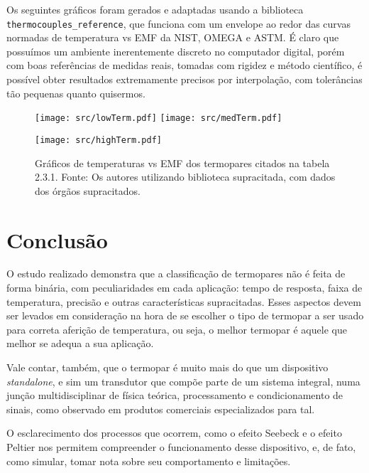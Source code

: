 \documentclass[a4paper,12pt]{report}
\begin{document}
	Os seguintes gráficos foram gerados e adaptadas usando a biblioteca \texttt{thermocouples\_reference}, que funciona com um envelope ao redor das curvas normadas de temperatura vs EMF da NIST, OMEGA e ASTM. É claro que possuímos um ambiente inerentemente discreto no computador digital, porém com boas referências de medidas reais, tomadas com rigidez e método científico, é possível obter resultados extremamente precisos por interpolação, com tolerâncias tão pequenas quanto quisermos.

	\begin{figure}[htbp]
	\texttt{[image: src/lowTerm.pdf]}
	\texttt{[image: src/medTerm.pdf]}
	\begin{center}
		\texttt{[image: src/highTerm.pdf]}
		
		\caption{Gráficos de temperaturas vs EMF dos termopares citados na tabela 2.3.1. Fonte: Os autores utilizando biblioteca supracitada, com dados dos órgãos supracitados.}
	\end{center}
	\end{figure}

\newpage

	\chapter{Conclusão}
	O estudo realizado demonstra que a classificação de termopares não é feita de forma binária, com peculiaridades em cada aplicação: tempo de resposta, faixa de temperatura, precisão e outras características supracitadas. Esses aspectos devem ser levados em consideração na hora de se escolher o tipo de termopar a ser usado para correta aferição de temperatura, ou seja, o melhor termopar é aquele que melhor se adequa a sua aplicação. 
	
	Vale contar, também, que o termopar é muito mais do que um dispositivo \textit{standalone}, e sim um transdutor que compõe parte de um sistema integral, numa junção multidisciplinar de física teórica, processamento e condicionamento de sinais, como observado em produtos comerciais especializados para tal.
	
	O esclarecimento dos processos que ocorrem, como o efeito Seebeck e o efeito Peltier nos permitem compreender o funcionamento desse dispositivo, e, de fato, como simular, tomar nota sobre seu comportamento e limitações.
	
	\nocite{*}
	

	
	
	
\end{document}
